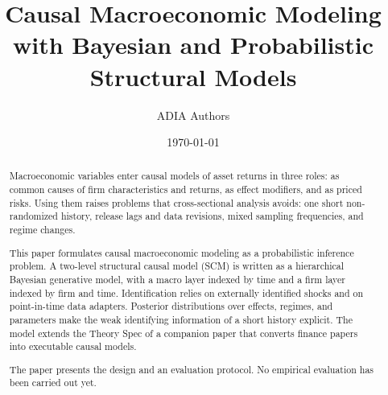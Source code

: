 


  \title{Causal Macroeconomic Modeling with Bayesian and Probabilistic
    Structural Models}

  \author{ADIA Authors}
  \address{\textless{}Department\textgreater{},
    \textless{}Organization\textgreater{},
    \textless{}City, State/Country\textgreater{}}


  \date{\today}

  \begin{abstract}
    Macroeconomic variables enter causal models of asset returns in three
    roles: as common causes of firm characteristics and returns, as effect
    modifiers, and as priced risks. Using them raises problems that
    cross-sectional analysis avoids: one short non-randomized history,
    release lags and data revisions, mixed sampling frequencies, and regime
    changes.

    This paper formulates causal macroeconomic modeling as a probabilistic
    inference problem. A two-level structural causal model (SCM) is written
    as a hierarchical Bayesian generative model, with a macro layer indexed
    by time and a firm layer indexed by firm and time. Identification relies
    on externally identified shocks and on point-in-time data adapters.
    Posterior distributions over effects, regimes, and parameters make the
    weak identifying information of a short history explicit. The model
    extends the Theory Spec of a companion paper that converts finance papers
    into executable causal models.

    The paper presents the design and an evaluation protocol. No empirical
    evaluation has been carried out yet.
  \end{abstract}

  \maketitle

  \setcounter{tocdepth}{2}
  \tableofcontents


